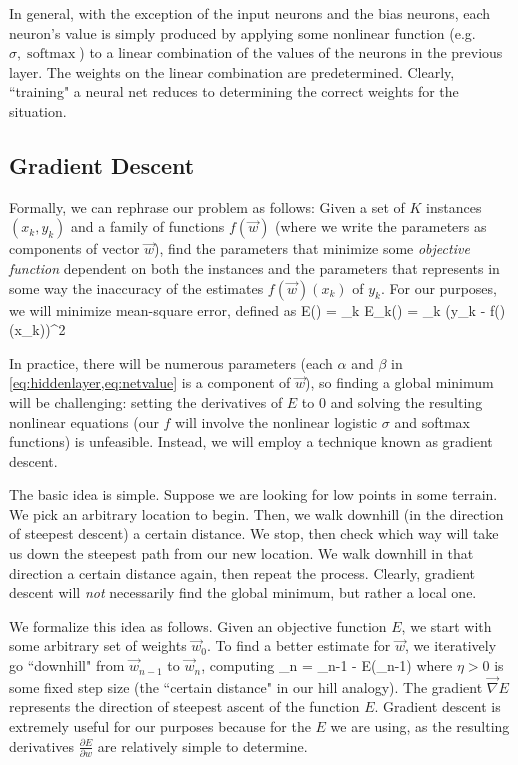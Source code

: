 \documentclass[10pt]{article}
\DeclareMathOperator{\softmax}{softmax}
\begin{document}
In general, with the exception of the input neurons and the bias neurons, each neuron's value is simply produced by applying some nonlinear function (e.g. $\sigma, \softmax$) to a linear combination of the values of the neurons in the previous layer.
The weights on the linear combination are predetermined.
Clearly, ``training" a neural net reduces to determining the correct weights for the situation.

\subsection{Gradient Descent}

Formally, we can rephrase our problem as follows: Given a set of $K$ instances $(x_k, y_k)$ and a family of functions $f(\vec{w})$ (where we write the parameters as components of vector $\vec{w}$), find the parameters that minimize some \emph{objective function} dependent on both the instances and the parameters that represents in some way the inaccuracy of the estimates $f(\vec{w})(x_k)$ of $y_k$.
For our purposes, we will minimize mean-square error, defined as
\beq
\label{eq:meansqerror}
E() = \sum_k E_k() = \sum_k (y_k - f()(x_k))^2
\eeq

In practice, there will be numerous parameters (each $\alpha$ and $\beta$ in \cref{eq:hiddenlayer,eq:netvalue} is a component of $\vec{w}$), so finding a global minimum will be challenging: setting the derivatives of $E$ to 0 and solving the resulting nonlinear equations (our $f$ will involve the nonlinear logistic $\sigma$ and softmax functions) is unfeasible.
Instead, we will employ a technique known as gradient descent.

The basic idea is simple.
Suppose we are looking for low points in some terrain.
We pick an arbitrary location to begin.
Then, we walk downhill (in the direction of steepest descent) a certain distance.
We stop, then check which way will take us down the steepest path from our new location.
We walk downhill in that direction a certain distance again, then repeat the process.
Clearly, gradient descent will \emph{not} necessarily find the global minimum, but rather a local one.

We formalize this idea as follows.
Given an objective function $E$, we start with some arbitrary set of weights $\vec{w}_0$.
To find a better estimate for $\vec{w}$, we iteratively go ``downhill" from $\vec{w}_{n-1}$ to $\vec{w}_{n}$, computing
\beq
\label{eq:graddescent}
_n = _{n-1} - \eta\vec{\nabla} E(_{n-1})
\eeq
where $\eta > 0$ is some fixed step size (the ``certain distance" in our hill analogy).
The gradient $\vec{\nabla} E$ represents the direction of steepest ascent of the function $E$.
Gradient descent is extremely useful for our purposes because for the $E$ we are using, as the resulting derivatives $\frac{\partial E}{\partial w}$ are relatively simple to determine.
\end{document}
